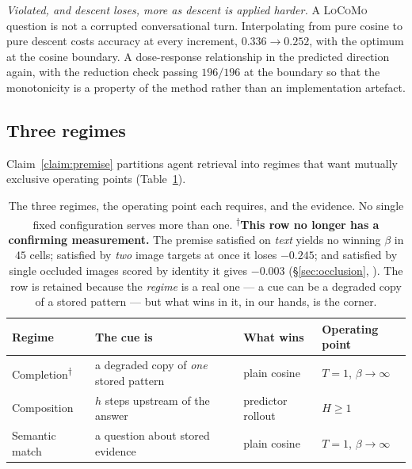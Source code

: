 \emph{Violated, and descent loses, more as descent is applied harder.} A \textsc{LoCoMo}
question is not a corrupted conversational turn. Interpolating from pure cosine to pure
descent costs accuracy at every increment, $0.336 \to 0.252$, with the optimum at the
cosine boundary. A dose-response relationship in the predicted direction again, with the
reduction check passing $196/196$ at the boundary so that the monotonicity is a property of
the method rather than an implementation artefact.

\subsection{Three regimes}

Claim~\ref{claim:premise} partitions agent retrieval into regimes that want mutually
exclusive operating points (Table~\ref{tab:regimes}).

\begin{table}[t]\centering\small
\caption{The three regimes, the operating point each requires, and the evidence. No single
fixed configuration serves more than one.
\textsuperscript{$\dagger$}\textbf{This row no longer has a confirming measurement.} The
premise satisfied on \emph{text} yields no winning $\beta$ in $45$ cells; satisfied by
\emph{two} image targets at once it loses $-0.245$; and satisfied by single occluded images
scored by identity it gives $-0.003$  (\S\ref{sec:occlusion},
). The row is retained because the \emph{regime} is a real one --- a cue can be a
degraded copy of a stored pattern --- but what wins in it, in our hands, is the corner.}
\label{tab:regimes}
\begin{tabular}{@{}llll@{}}
\toprule
\textbf{Regime} & \textbf{The cue is} & \textbf{What wins} & \textbf{Operating point} \\
\midrule
Completion\textsuperscript{$\dagger$} & a degraded copy of \emph{one} stored pattern & plain cosine & $T{=}1$, $\beta\to\infty$ \\
Composition & $h$ steps upstream of the answer & predictor rollout & $H\geq 1$ \\
Semantic match & a question about stored evidence & plain cosine & $T{=}1$, $\beta\to\infty$ \\
\bottomrule
\end{tabular}
\end{table}

